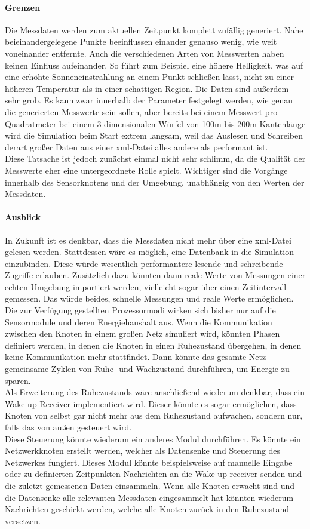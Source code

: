 \paragraph{Grenzen}
Die Messdaten werden zum aktuellen Zeitpunkt komplett zufällig generiert. Nahe beieinandergelegene Punkte beeinflussen einander genauso wenig, wie weit voneinander entfernte. Auch die verschiedenen Arten von Messwerten haben keinen Einfluss aufeinander. So führt zum Beispiel eine höhere Helligkeit, was auf eine erhöhte Sonneneinstrahlung an einem Punkt schließen lässt, nicht zu einer höheren Temperatur als in einer schattigen Region. Die Daten sind außerdem sehr grob. Es kann zwar innerhalb der Parameter festgelegt werden, wie genau die generierten Messwerte sein sollen, aber bereits bei einem Messwert pro Quadratmeter bei einem 3-dimensionalen Würfel von 100m bis 200m Kantenlänge wird die Simulation beim Start extrem langsam, weil das Auslesen und Schreiben derart großer Daten aus einer xml-Datei alles andere als performant ist. \\
Diese Tatsache ist jedoch zunächst einmal nicht sehr schlimm, da die Qualität der Messwerte eher eine untergeordnete Rolle spielt. Wichtiger sind die Vorgänge innerhalb des Sensorknotens und der Umgebung, unabhängig von den Werten der Messdaten.
\paragraph{Ausblick}
In Zukunft ist es denkbar, dass die Messdaten nicht mehr über eine xml-Datei gelesen werden. Stattdessen wäre es möglich, eine Datenbank in die Simulation einzubinden. Diese würde wesentlich performantere lesende und schreibende Zugriffe erlauben. Zusätzlich dazu könnten dann reale Werte von Messungen einer echten Umgebung importiert werden, vielleicht sogar über einen Zeitintervall gemessen. Das würde beides, schnelle Messungen und reale Werte ermöglichen.\\
Die zur Verfügung gestellten Prozessormodi wirken sich bisher nur auf die Sensormodule und deren Energiehaushalt aus. Wenn die Kommunikation zwischen den Knoten in einem großen Netz simuliert wird, könnten Phasen definiert werden, in denen die Knoten in einen Ruhezustand übergehen, in denen keine Kommunikation mehr stattfindet. Dann könnte das gesamte Netz gemeinsame Zyklen von Ruhe- und Wachzustand durchführen, um Energie zu sparen.\\
Als Erweiterung des Ruhezustands wäre anschließend wiederum denkbar, dass ein Wake-up-Receiver implementiert wird. Dieser könnte es sogar ermöglichen, dass Knoten von selbst gar nicht mehr aus dem Ruhezustand aufwachen, sondern nur, falls das von außen gesteuert wird.\\
Diese Steuerung könnte wiederum ein anderes Modul durchführen. Es könnte ein Netzwerkknoten erstellt werden, welcher als Datensenke und Steuerung des Netzwerkes fungiert. Dieses Modul könnte beispielsweise auf manuelle Eingabe oder zu definierten Zeitpunkten Nachrichten an die Wake-up-receiver senden und die zuletzt gemessenen Daten einsammeln. Wenn alle Knoten erwacht sind und die Datensenke alle relevanten Messdaten eingesammelt hat könnten wiederum Nachrichten geschickt werden, welche alle Knoten zurück in den Ruhezustand versetzen.

